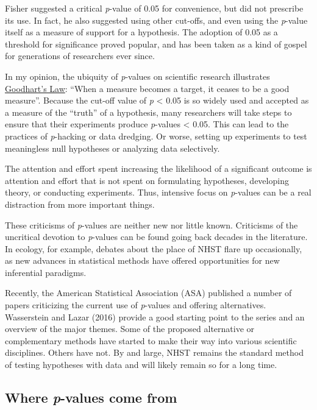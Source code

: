 \documentclass[
  13,
  letterpaper,
]{report}
\begin{document}
Fisher suggested a critical \emph{p}-value of 0.05 for convenience, but
did not prescribe its use. In fact, he also suggested using other
cut-offs, and even using the \emph{p}-value itself as a measure of
support for a hypothesis. The adoption of 0.05 as a threshold for
significance proved popular, and has been taken as a kind of gospel for
generations of researchers ever since.

In my opinion, the ubiquity of \emph{p}-values on scientific research
illustrates
\href{https://en.wikipedia.org/wiki/Goodhart\%27s_law}{Goodhart's Law}:
``When a measure becomes a target, it ceases to be a good measure''.
Because the cut-off value of \emph{p} \textless{} 0.05 is so widely used
and accepted as a measure of the ``truth'' of a hypothesis, many
researchers will take steps to ensure that their experiments produce
\emph{p}-values \textless{} 0.05. This can lead to the practices of
\emph{p}-hacking or data dredging. Or worse, setting up experiments to
test meaningless null hypotheses or analyzing data selectively.

The attention and effort spent increasing the likelihood of a
significant outcome is attention and effort that is not spent on
formulating hypotheses, developing theory, or conducting experiments.
Thus, intensive focus on \emph{p}-values can be a real distraction from
more important things.

These criticisms of \emph{p}-values are neither new nor little known.
Criticisms of the uncritical devotion to \emph{p}-values can be found
going back decades in the literature. In ecology, for example, debates
about the place of NHST flare up occasionally, as new advances in
statistical methods have offered opportunities for new inferential
paradigms.

Recently, the American Statistical Association (ASA) published a number
of papers criticizing the current use of \emph{p}-values and offering
alternatives. Wasserstein and Lazar (2016) provide a good starting point
to the series and an overview of the major themes. Some of the proposed
alternative or complementary methods have started to make their way into
various scientific disciplines. Others have not. By and large, NHST
remains the standard method of testing hypotheses with data and will
likely remain so for a long time.

\subsection{\texorpdfstring{Where \emph{p}-values come
from}{Where p-values come from}}\label{where-p-values-come-from}
\end{document}
